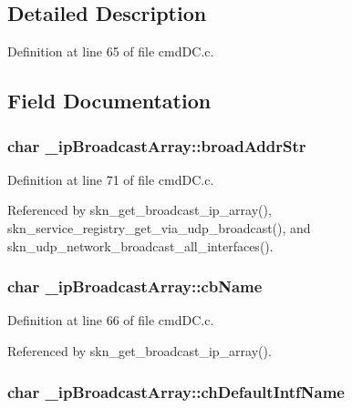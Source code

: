 \subsection{Detailed Description}


Definition at line 65 of file cmd\+D\+C.\+c.



\subsection{Field Documentation}
\hypertarget{struct__ip_broadcast_array_af40943e174ba847fa0218cfa6051e277}{
\subsubsection[{broad\+Addr\+Str}]{\setlength{\rightskip}{0pt plus 5cm}char \+\_\+ip\+Broadcast\+Array\+::broad\+Addr\+Str}}\label{struct__ip_broadcast_array_af40943e174ba847fa0218cfa6051e277}


Definition at line 71 of file cmd\+D\+C.\+c.



Referenced by skn\+\_\+get\+\_\+broadcast\+\_\+ip\+\_\+array(), skn\+\_\+service\+\_\+registry\+\_\+get\+\_\+via\+\_\+udp\+\_\+broadcast(), and skn\+\_\+udp\+\_\+network\+\_\+broadcast\+\_\+all\+\_\+interfaces().

\hypertarget{struct__ip_broadcast_array_a0f592bd31dcc3ce00a349f04ff6bd1ba}{
\subsubsection[{cb\+Name}]{\setlength{\rightskip}{0pt plus 5cm}char \+\_\+ip\+Broadcast\+Array\+::cb\+Name}}\label{struct__ip_broadcast_array_a0f592bd31dcc3ce00a349f04ff6bd1ba}


Definition at line 66 of file cmd\+D\+C.\+c.



Referenced by skn\+\_\+get\+\_\+broadcast\+\_\+ip\+\_\+array().

\hypertarget{struct__ip_broadcast_array_a06dab8742df19b5aec8538842617778d}{
\subsubsection[{ch\+Default\+Intf\+Name}]{\setlength{\rightskip}{0pt plus 5cm}char \+\_\+ip\+Broadcast\+Array\+::ch\+Default\+Intf\+Name}}\label{struct__ip_broadcast_array_a06dab8742df19b5aec8538842617778d}


